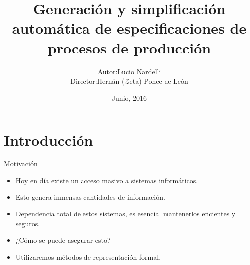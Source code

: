 \documentclass[spanish,pdf]{beamer}
\begin{document}
  
\title[Gen. y simp. de especificaciones de procesos de producción]{Generación y simplificación automática de especificaciones de procesos de producción}
\author[Lucio Nardelli]{\begin{tabular}{r@{ }l} 
  Autor:      & Lucio Nardelli \\[1ex]
  Director:   & Hernán ($\mathcal{Z}$eta) Ponce de León\\
  \end{tabular}}
\date{Junio, 2016}
  
\begin{frame}
  \titlepage
\end{frame}
  
  
\section{Introducción}
  
\begin{frame}{Motivación}{}
    \begin{itemize}
      \setlength\itemsep{0.4cm}
      \item<2-> Hoy en día existe un acceso masivo a sistemas informáticos.
      \item<3-> Esto genera inmensas cantidades de información.
      \item<4-> Dependencia total de estos sistemas, es esencial mantenerlos eficientes y seguros.
      \item<5-> ¿Cómo se puede asegurar esto?
      \item<6-> Utilizaremos métodos de representación formal.
    \end{itemize}
\end{frame}
\end{document}
